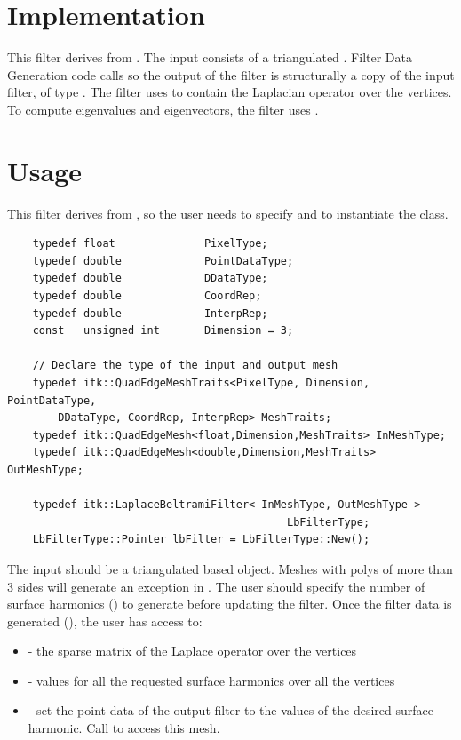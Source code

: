 \documentclass{InsightArticle}
\begin{document}
\section{Implementation}
This filter derives from .  The input 
consists of a triangulated .  Filter Data Generation code
calls  so the output of the filter is
structurally a copy of the input filter, of type .
The filter uses  to contain the Laplacian
operator over the vertices.  To compute eigenvalues and eigenvectors, the
filter uses .

\section{Usage}
This filter derives from , so the user
needs to specify  and  to instantiate the
class.
\small
\begin{verbatim}
    typedef float              PixelType;
    typedef double             PointDataType;
    typedef double             DDataType;
    typedef double             CoordRep;
    typedef double             InterpRep;
    const   unsigned int       Dimension = 3;

    // Declare the type of the input and output mesh
    typedef itk::QuadEdgeMeshTraits<PixelType, Dimension, PointDataType,
        DDataType, CoordRep, InterpRep> MeshTraits;
    typedef itk::QuadEdgeMesh<float,Dimension,MeshTraits> InMeshType;
    typedef itk::QuadEdgeMesh<double,Dimension,MeshTraits> OutMeshType;

    typedef itk::LaplaceBeltramiFilter< InMeshType, OutMeshType >
                                            LbFilterType;
    LbFilterType::Pointer lbFilter = LbFilterType::New();

\end{verbatim}
\normalsize
The input should be a triangulated  based object.
Meshes with polys of
more than 3 sides will generate an exception in .
The user should specify the
number of surface harmonics () 
to generate before updating the filter.
Once the filter data is generated (), the user has
access to:
\begin{itemize}
\item {} - the sparse matrix of the Laplace operator over
the vertices
\item {} - values for all the requested surface harmonics
over all the vertices
\item {} - set the point data of the output filter to
the values of the desired surface harmonic.  Call  to access
this mesh.
\end{itemize}
\end{document}
